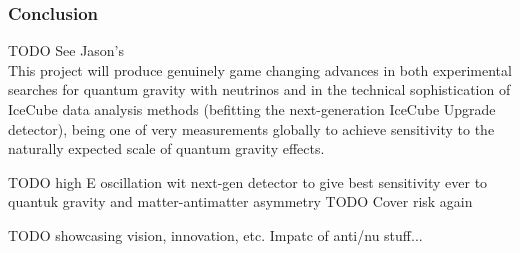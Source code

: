 \documentclass[a4paper,11pt]{article}
\begin{document}
\subsubsection{Conclusion}

TODO See Jason's \\

This project will produce genuinely game changing advances in both experimental searches for quantum gravity with neutrinos and in the technical sophistication of IceCube data analysis methods (befitting the next-generation IceCube Upgrade detector), being one of very measurements globally to achieve sensitivity to the naturally expected scale of quantum gravity effects.

TODO high E oscillation wit next-gen detector to give best sensitivity ever to quantuk gravity and matter-antimatter asymmetry
TODO Cover risk again

TODO showcasing vision, innovation, etc. Impatc of anti/nu stuff...




\end{document}
